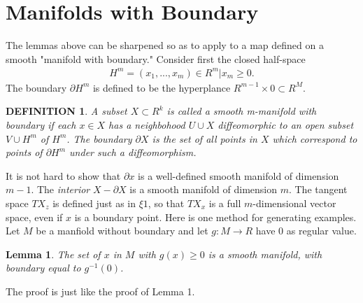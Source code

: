 \documentclass[12pt, openany, closeany]{book}
\newtheorem{lemma}{Lemma}
\theoremstyle{corollary}
\newtheorem*{definition}{DEFINITION}
\begin{document}
  \section{Manifolds with Boundary}
  The lemmas above can be sharpened so as to apply to a map defined on a smooth "manifold with boundary." Consider first the closed half-space
  \begin{align*}
    H^m = {(x_{1}, ..., x_{m})\in R^m | x_{m}\geq 0}.
  \end{align*}
  The boundary $\partial H^m$ is defined to be the hyperplance $R^{m-1} \times 0 \subset R^M$.
  \begin{definition}
    A subset $X \subset R^k$ is called a \emph{smooth m-manifold with boundary} if each $x\in X$ has a neighbohood $U \cup X$ diffeomorphic to an open subset $V\cup H^m$ of $H^m$. The \emph{boundary} ${\partial X}$ is the set of all points in $X$ which correspond to points of $\partial H^m$ under such a diffeomorphism.
  \end{definition}
  It is not hard to show that $\partial x$ is a well-defined smooth manifold of dimension $m - 1$. The \emph{interior} $X - \partial X$ is a smooth manifold of dimension $m$.
  The tangent space $TX_{z}$ is defined just as in $\xi 1$, so that $TX_{x}$ is a full $m$-dimensional vector space, even if $x$ is a boundary point.
  Here is one method for generating examples. Let $M$ be a manfiold without boundary and let $g : M \to R$ have $0$ as regular value.
  \begin{lemma}
    The set of $x$ in $M$ with $g(x) \geq 0$ is a smooth manifold, with boundary equal to $g^{-1}(0)$.
  \end{lemma}
  The proof is just like the proof of Lemma 1.
\end{document}
